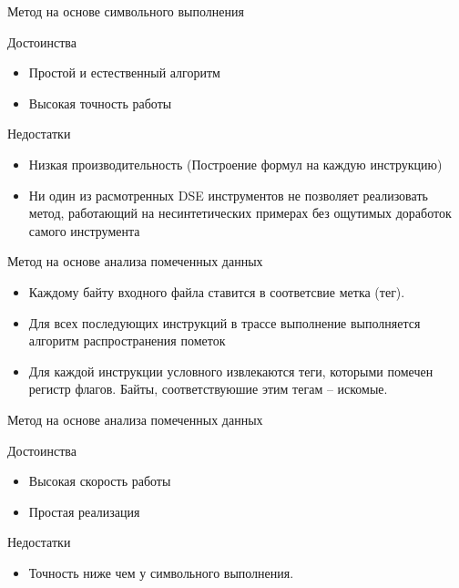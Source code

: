 \documentclass[10pt]{beamer}
\begin{document}
\begin{frame}{Метод на основе символьного выполнения}

\begin{block}{Достоинства}
  \begin{itemize}
    \item Простой и естественный алгоритм
    \item Высокая точность работы
  \end{itemize}
\end{block}
\pause
  \begin{block}{Недостатки}
    \begin{itemize}
      \item Низкая производительность (Построение формул на каждую инструкцию)
      \item Ни один из расмотренных DSE инструментов не позволяет реализовать метод, работающий на несинтетических примерах без ощутимых доработок самого инструмента
    \end{itemize}
  \end{block}
\end{frame}


\begin{frame}{Метод на основе анализа помеченных данных}

    \begin{itemize}
      \item Каждому байту входного файла ставится в соответсвие метка (тег).
      \item Для всех последующих инструкций в трассе выполнение выполняется алгоритм распространения пометок
      \item Для каждой инструкции условного извлекаются теги, которыми помечен регистр флагов. Байты, соответствуюшие этим тегам -- искомые.
    \end{itemize}
\end{frame}

\begin{frame}{Метод на основе анализа помеченных данных}

\begin{block}{Достоинства}
  \begin{itemize}
    \item Высокая скорость работы
    \item Простая реализация
  \end{itemize}
\end{block}
\pause
  \begin{block}{Недостатки}
    \begin{itemize}
      \item Точность ниже чем у символьного выполнения.
    \end{itemize}
  \end{block}
\end{frame}
\end{document}
